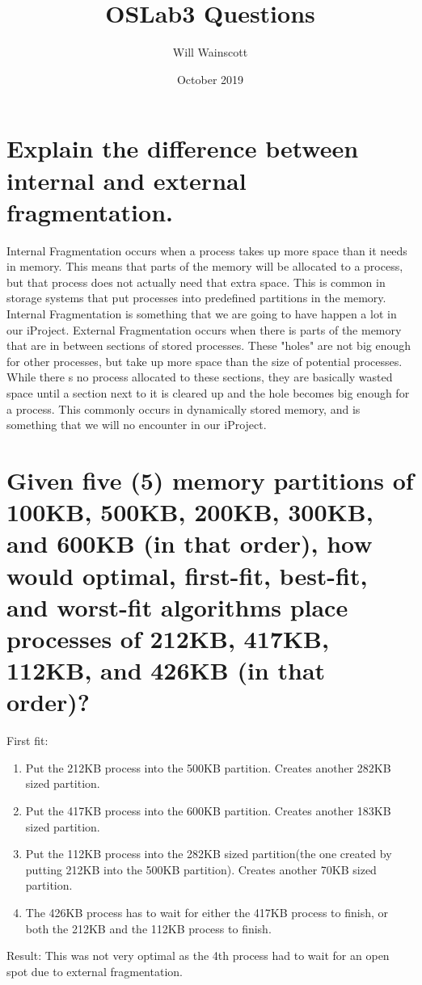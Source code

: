 \documentclass{article}
\title{OSLab3 Questions}
\author{Will Wainscott}
\date{October 2019}
\begin{document}
\maketitle

\section{Explain the difference between internal and external fragmentation.}

Internal Fragmentation occurs when a process takes up more space than it needs in memory. This means that parts of the memory will be allocated to a process, but that process does not actually need that extra space. This is common in storage systems that put processes into predefined partitions in the memory. Internal Fragmentation is something that we are going to have happen a lot in our iProject. External Fragmentation occurs when there is parts of the memory that are in between sections of stored processes. These "holes" are not big enough for other processes, but take up more space than the size of potential processes. While there s no process allocated to these sections, they are basically wasted space until a section next to it is cleared up and the hole becomes big enough for a process. This commonly occurs in dynamically stored  memory, and is something that we will no encounter in our iProject.

\section{Given five (5) memory partitions of 100KB, 500KB, 200KB, 300KB, and 600KB (in that order), how would optimal, first-fit, best-fit, and worst-fit algorithms place processes of 212KB, 417KB, 112KB, and 426KB (in that order)?}

First fit:
\begin{enumerate}
    \item Put the 212KB process into the 500KB partition. Creates another 282KB sized partition.
    \item Put the 417KB process into the 600KB partition. Creates another 183KB sized partition.
    \item Put the 112KB process into the 282KB sized partition(the one created by putting 212KB into the 500KB partition). Creates another 70KB sized partition.
    \item The 426KB process has to wait for either the 417KB process to finish, or both the 212KB and the 112KB process to finish.
\end{enumerate}
Result: This was not very optimal as the 4th process had to wait for an open spot due to external fragmentation.
\vspace{5mm}
\end{document}
